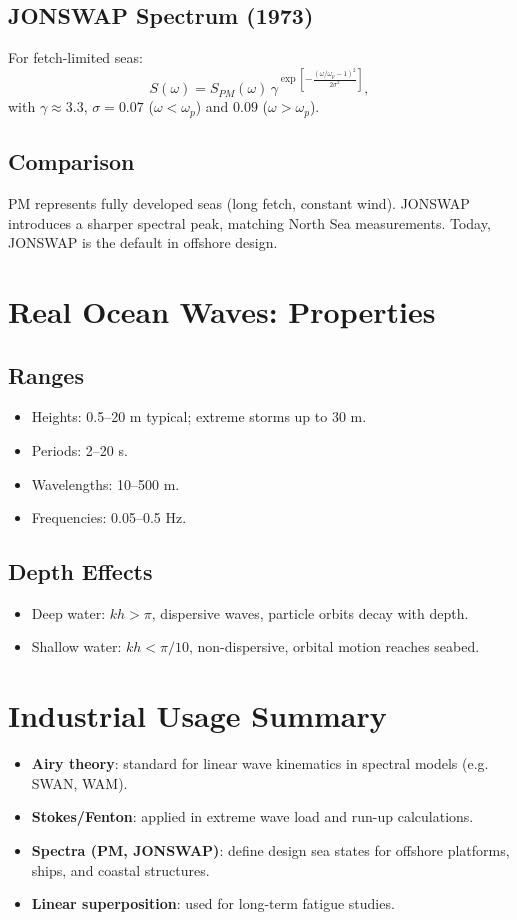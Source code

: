 \documentclass[11pt,a4paper]{article}
\begin{document}
\subsection{JONSWAP Spectrum (1973)}
For fetch-limited seas:
\begin{equation}
S(\omega) = S_{PM}(\omega)\,\gamma^{\exp\left[-\frac{(\omega/\omega_p - 1)^2}{2\sigma^2}\right]},
\end{equation}
with $\gamma\approx 3.3$, $\sigma=0.07$ ($\omega<\omega_p$) and $0.09$ ($\omega>\omega_p$).

\subsection{Comparison}
PM represents fully developed seas (long fetch, constant wind).  
JONSWAP introduces a sharper spectral peak, matching North Sea measurements.  
Today, JONSWAP is the default in offshore design.

\section{Real Ocean Waves: Properties}
\subsection{Ranges}
\begin{itemize}
\item Heights: 0.5–20 m typical; extreme storms up to 30 m.
\item Periods: 2–20 s.
\item Wavelengths: 10–500 m.
\item Frequencies: 0.05–0.5 Hz.
\end{itemize}

\subsection{Depth Effects}
\begin{itemize}
\item Deep water: $kh > \pi$, dispersive waves, particle orbits decay with depth.
\item Shallow water: $kh < \pi/10$, non-dispersive, orbital motion reaches seabed.
\end{itemize}

\section{Industrial Usage Summary}
\begin{itemize}
\item \textbf{Airy theory}: standard for linear wave kinematics in spectral models (e.g. SWAN, WAM).
\item \textbf{Stokes/Fenton}: applied in extreme wave load and run-up calculations.
\item \textbf{Spectra (PM, JONSWAP)}: define design sea states for offshore platforms, ships, and coastal structures.
\item \textbf{Linear superposition}: used for long-term fatigue studies.
\end{itemize}
\end{document}
